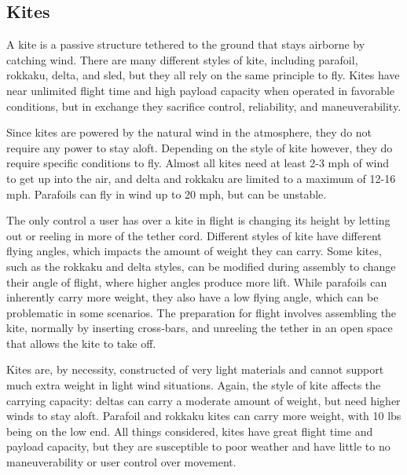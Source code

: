 \subsection{Kites}
A kite is a passive structure tethered to the ground that stays airborne by catching wind. There are many different styles of kite, including parafoil, rokkaku, delta, and sled, but they all rely on the same principle to fly.\cite{kite_iqp} Kites have near unlimited flight time and high payload capacity when operated in favorable conditions, but in exchange they sacrifice control, reliability, and maneuverability.\par
Since kites are powered by the natural wind in the atmosphere, they do not require any power to stay aloft. Depending on the style of kite however, they do require specific conditions to fly. Almost all kites need at least 2-3 mph of wind to get up into the air, and delta and rokkaku are limited to a maximum of 12-16 mph.\cite{kite_iqp} Parafoils can fly in wind up to 20 mph, but can be unstable\cite{kite_iqp}.\par
The only control a user has over a kite in flight is changing its height by letting out or reeling in more of the tether cord. Different styles of kite have different flying angles, which impacts the amount of weight they can carry. Some kites, such as the rokkaku and delta styles, can be modified during assembly to change their angle of flight, where higher angles produce more lift. While parafoils can inherently carry more weight, they also have a low flying angle, which can be problematic in some scenarios. The preparation for flight involves assembling the kite, normally by inserting cross-bars, and unreeling the tether in an open space that allows the kite to take off.\par
Kites are, by necessity, constructed of very light materials and cannot support much extra weight in light wind situations. Again, the style of kite affects the carrying capacity: deltas can carry a moderate amount of weight, but need higher winds to stay aloft. Parafoil and rokkaku kites can carry more weight, with 10 lbs being on the low end. All things considered, kites have great flight time and payload capacity, but they are susceptible to poor weather and have little to no maneuverability or user control over movement.

